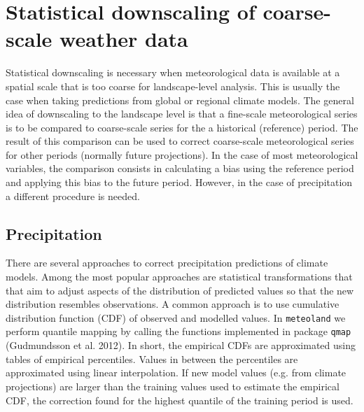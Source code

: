 \documentclass[11pt,a4paper]{article}
\begin{document}
\section{Statistical downscaling of coarse-scale weather data}
Statistical downscaling is necessary when meteorological data is available at a spatial scale that is too coarse for landscape-level analysis. This is usually the case when taking predictions from global or regional climate models. The general idea of downscaling to the landscape level is that a fine-scale meteorological series is to be compared to coarse-scale series for the a historical (reference) period. The result of this comparison can be used to correct coarse-scale meteorological series for other periods (normally future projections). In the case of most meteorological variables, the comparison consists in calculating a bias using the reference period and applying this bias to the future period. However, in the case of precipitation a different procedure is needed.

\subsection{Precipitation}
There are several approaches to correct precipitation predictions of climate models. Among the most popular approaches are statistical transformations that that aim to adjust aspects of the distribution of predicted values so that the new distribution resembles observations. A common approach is to use cumulative distribution function (CDF) of observed and modelled values. In \texttt{meteoland} we perform quantile mapping by calling the functions implemented in package \texttt{qmap} (Gudmundsson et al. 2012). In short, the empirical CDFs are approximated using tables of empirical percentiles. Values in between the percentiles are approximated using linear interpolation. If new model values (e.g. from climate projections) are larger than the training values used to estimate the empirical CDF, the correction found for the highest quantile of the training period is used. 
\end{document}
